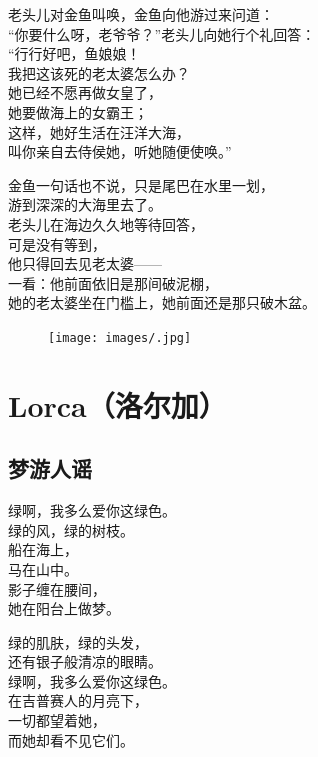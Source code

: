 \documentclass[]{book}
\renewenvironment{quote}{\begin{VF}}{\end{VF}}
\begin{document}
\begin{quote}
老头儿对金鱼叫唤，金鱼向他游过来问道：\\
``你要什么呀，老爷爷？''老头儿向她行个礼回答：\\
``行行好吧，鱼娘娘！\\
我把这该死的老太婆怎么办？\\
她已经不愿再做女皇了，\\
她要做海上的女霸王；\\
这样，她好生活在汪洋大海，\\
叫你亲自去侍侯她，听她随便使唤。''

金鱼一句话也不说，只是尾巴在水里一划，\\
游到深深的大海里去了。\\
老头儿在海边久久地等待回答，\\
可是没有等到，\\
他只得回去见老太婆------\\
一看：他前面依旧是那间破泥棚，\\
她的老太婆坐在门槛上，她前面还是那只破木盆。
\end{quote}

\begin{figure}[htbp]
\centering
\texttt{[image: images/.jpg]}
\caption{}
\end{figure}

\chapter{Lorca（洛尔加）}\label{lorca}

\section{梦游人谣}

\begin{quote}
绿啊，我多么爱你这绿色。\\
绿的风，绿的树枝。\\
船在海上，\\
马在山中。\\
影子缠在腰间，\\
她在阳台上做梦。

绿的肌肤，绿的头发，\\
还有银子般清凉的眼睛。\\
绿啊，我多么爱你这绿色。\\
在吉普赛人的月亮下，\\
一切都望着她，\\
而她却看不见它们。
\end{quote}
\end{document}
